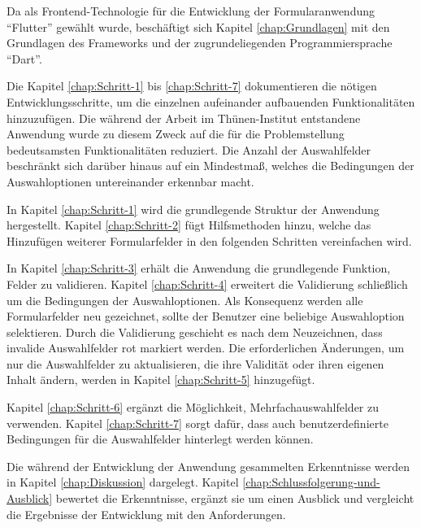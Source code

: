 Da als Frontend-Technologie für die Entwicklung der Formularanwendung \enquote{Flutter} gewählt wurde,
beschäftigt sich Kapitel \ref{chap:Grundlagen} mit den Grundlagen des Frameworks und der zugrundeliegenden Programmiersprache \enquote{Dart}.

Die Kapitel \ref{chap:Schritt-1} bis \ref{chap:Schritt-7} dokumentieren die nötigen Entwicklungsschritte,
um die einzelnen aufeinander aufbauenden  Funktionalitäten hinzuzufügen.
Die während der Arbeit im Thünen-Institut entstandene Anwendung wurde zu diesem Zweck auf die für die  Problemstellung bedeutsamsten Funktionalitäten reduziert.
Die Anzahl der Auswahlfelder beschränkt sich darüber hinaus auf ein Mindestmaß,
welches die Bedingungen der Auswahloptionen untereinander erkennbar macht. 

In Kapitel \ref{chap:Schritt-1} wird die grundlegende Struktur der Anwendung hergestellt.
Kapitel \ref{chap:Schritt-2} fügt Hilfsmethoden hinzu,
welche  das Hinzufügen  weiterer Formularfelder  in den folgenden Schritten vereinfachen wird.

In Kapitel \ref{chap:Schritt-3} erhält die Anwendung die grundlegende Funktion,
Felder zu validieren.
Kapitel \ref{chap:Schritt-4} erweitert die Validierung schließlich um die Bedingungen der Auswahloptionen.
Als Konsequenz werden alle Formularfelder neu gezeichnet,
sollte  der Benutzer eine beliebige Auswahloption selektieren.
Durch die Validierung  geschieht es nach dem Neuzeichnen,
dass invalide Auswahlfelder rot markiert werden.
Die erforderlichen Änderungen,
um nur die Auswahlfelder zu aktualisieren,
die ihre Validität oder ihren eigenen Inhalt ändern,
werden in Kapitel \ref{chap:Schritt-5} hinzugefügt.

Kapitel \ref{chap:Schritt-6} ergänzt die Möglichkeit,
Mehrfachauswahlfelder zu verwenden.
Kapitel \ref{chap:Schritt-7} sorgt dafür,
dass auch benutzerdefinierte Bedingungen für die Auswahlfelder hinterlegt werden können.

Die während der Entwicklung der Anwendung gesammelten Erkenntnisse werden in Kapitel \ref{chap:Diskussion} dargelegt.
Kapitel \ref{chap:Schlussfolgerung-und-Ausblick} bewertet die Erkenntnisse,
ergänzt sie um einen Ausblick und vergleicht die Ergebnisse der Entwicklung mit den Anforderungen.

